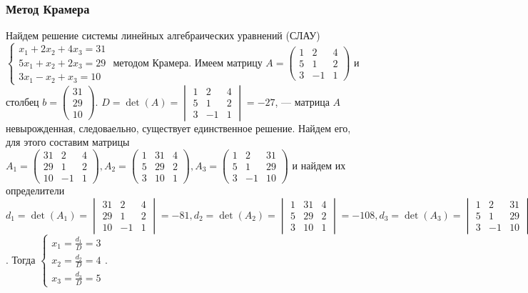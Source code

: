 \documentclass[14pt]{extreport}
\begin{document}
\subsubsection{Метод Крамера}

Найдем решение системы линейных алгебраических уравнений (СЛАУ)\\$\begin{cases}x_1 + 2x_2 + 4x_3 = 31\\
5x_1 + x_2 + 2x_3 = 29\\ 3x_1 - x_2 + x_3 = 10\end{cases}$ методом Крамера.
Имеем матрицу $A = \begin{pmatrix}1&2&4\\5&1&2\\3&-1&1\end{pmatrix}$ и столбец $b = \begin{pmatrix}
31\\29\\10\end{pmatrix}$. $D = \det{(A)} = \begin{vmatrix}
1&2&4\\5&1&2\\3&-1&1\end{vmatrix} = -27$, --- матрица $A$ невырожденная, следоваельно, существует
единственное решение. Найдем его, для этого составим матрицы 
$A_1 = \begin{pmatrix}31&2&4\\29&1&2\\10&-1&1\end{pmatrix},
A_2 = \begin{pmatrix}1&31&4\\5&29&2\\3&10&1\end{pmatrix},
A_3 = \begin{pmatrix}1&2&31\\5&1&29 \\3&-1&10\end{pmatrix}$ и найдем их определители
$d_1 = \det{(A_1)} = \begin{vmatrix}31&2&4\\29&1&2\\10&-1&1\end{vmatrix} =
-81, d_2 = \det{(A_2)} = \begin{vmatrix}1&31&4\\5&29&2\\3&10&1\end{vmatrix} = -108, d_3 = \det{(A_3)} =
\begin{vmatrix}1&2&31\\5&1&29 \\3&-1&10\end{vmatrix} = -135$. Тогда $\begin{cases}x_1 = \frac{d_1}
{D} = 3\\ x_2 = \frac{d_2}{D} = 4 \\ x_3 = \frac{d_3}{D} =5\end{cases}$.
\end{document}
